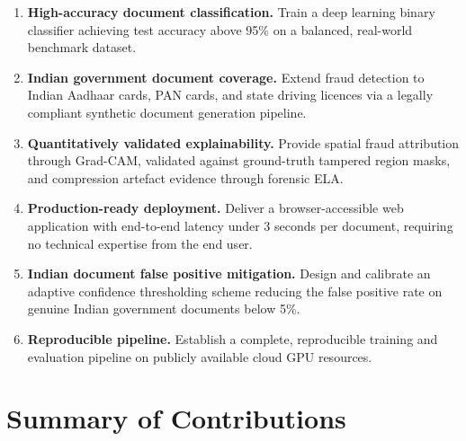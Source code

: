 \documentclass[12pt,a4paper,oneside]{report}
\begin{document}
\begin{enumerate}[label=\textbf{O\arabic*:}]

\item \textbf{High-accuracy document classification.} Train a deep learning
binary classifier achieving test accuracy above 95\% on a balanced, real-world
benchmark dataset.

\item \textbf{Indian government document coverage.} Extend fraud detection
to Indian Aadhaar cards, PAN cards, and state driving licences via a legally
compliant synthetic document generation pipeline.

\item \textbf{Quantitatively validated explainability.} Provide spatial fraud
attribution through Grad-CAM, validated against ground-truth tampered region
masks, and compression artefact evidence through forensic ELA.

\item \textbf{Production-ready deployment.} Deliver a browser-accessible web
application with end-to-end latency under 3 seconds per document, requiring
no technical expertise from the end user.

\item \textbf{Indian document false positive mitigation.} Design and calibrate
an adaptive confidence thresholding scheme reducing the false positive rate on
genuine Indian government documents below 5\%.

\item \textbf{Reproducible pipeline.} Establish a complete, reproducible
training and evaluation pipeline on publicly available cloud GPU resources.

\end{enumerate}

\section{Summary of Contributions}
\end{document}
